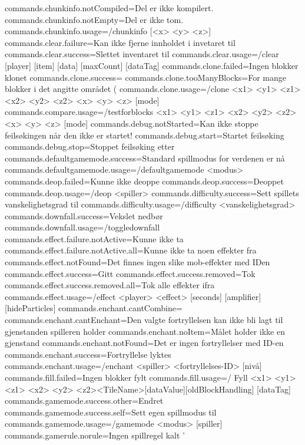commands.chunkinfo.notCompiled=Del er ikke kompilert.
commands.chunkinfo.notEmpty=Del er ikke tom.
commands.chunkinfo.usage=/chunkinfo [<x> <y> <z>]
commands.clear.failure=Kan ikke fjerne innholdet i invetaret til %
commands.clear.success=Slettet inventaret til %
commands.clear.usage=/clear [player] [item] [data] [maxCount] [dataTag]
commands.clone.failed=Ingen blokker klonet
commands.clone.success=%
commands.clone.tooManyBlocks=For mange blokker i det angitte området (%
commands.clone.usage=/clone <x1> <y1> <z1> <x2> <y2> <z2> <x> <y> <z> [mode]
commands.compare.usage=/testforblocks <x1> <y1> <z1> <x2> <y2> <z2> <x> <y> <z> [mode]
commands.debug.notStarted=Kan ikke stoppe feilsøkingen når den ikke er startet!
commands.debug.start=Startet feilsøking
commands.debug.stop=Stoppet feilsøking etter %
commands.defaultgamemode.success=Standard spillmodus for verdenen er nå %
commands.defaultgamemode.usage=/defaultgamemode <modus>
commands.deop.failed=Kunne ikke deoppe %
commands.deop.success=Deoppet %
commands.deop.usage=/deop <spiller>
commands.difficulty.success=Sett spillets vanskelighetsgrad til %
commands.difficulty.usage=/difficulty <vanskelighetsgrad>
commands.downfall.success=Vekslet nedbør
commands.downfall.usage=/toggledownfall
commands.effect.failure.notActive=Kunne ikke ta %
commands.effect.failure.notActive.all=Kunne ikke ta noen effekter fra %
commands.effect.notFound=Det finnes ingen slike mob-effekter med IDen %
commands.effect.success=Gitt %
commands.effect.success.removed=Tok %
commands.effect.success.removed.all=Tok alle effekter ifra %
commands.effect.usage=/effect <player> <effect> [seconds] [amplifier] [hideParticles]
commands.enchant.cantCombine=%
commands.enchant.cantEnchant=Den valgte fortryllelsen kan ikke bli lagt til gjenstanden spilleren holder
commands.enchant.noItem=Målet holder ikke en gjenstand
commands.enchant.notFound=Det er ingen fortryllelser med ID-en %
commands.enchant.success=Fortryllelse lyktes
commands.enchant.usage=/enchant <spiller> <fortryllelses-ID> [nivå]
commands.fill.failed=Ingen blokker fylt
commands.fill.usage=/ Fyll <x1> <y1> <z1> <x2> <y2> <z2><TileName>[dataValue][oldBlockHandling] [dataTag]
commands.gamemode.success.other=Endret %
commands.gamemode.success.self=Sett egen spillmodus til %
commands.gamemode.usage=/gamemode <modus> [spiller]
commands.gamerule.norule=Ingen spillregel kalt '%
